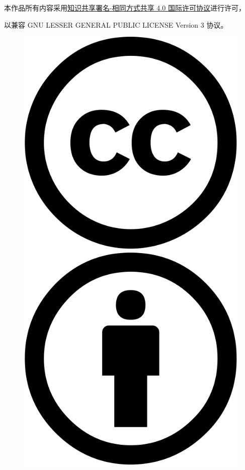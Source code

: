 \documentclass[UTF-8]{ctexart}
\begin{document}
	\newpage
	
	\vspace*{\fill}
	\begin{center}
		{\large
		本作品所有内容采用\href{http://creativecommons.org/licenses/by-sa/4.0/"}{知识共享署名-相同方式共享 4.0 国际许可协议}进行许可，
		
		以兼容 GNU LESSER GENERAL PUBLIC LICENSE Version 3 协议。
		}
		\begin{figure}[H]
			\centering
			\begin{minipage}{0.15\textwidth}
				\centering
				\includegraphics[width=\textwidth]{fig/cc.xlarge.png}
				\caption*{}
			\end{minipage}
			\begin{minipage}{0.15\textwidth}
				\centering
				\includegraphics[width=\textwidth]{fig/by.xlarge.png}

\end{minipage}
\end{figure}
\end{center}
\end{document}
